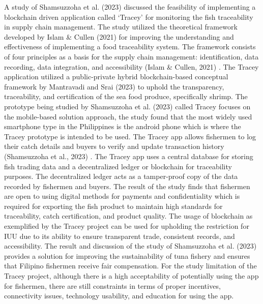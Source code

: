 A study of Shamsuzzoha et al.  (2023) \nocite{rrl-ETITSC1} discussed the feasibility of implementing a blockchain driven application called ‘Tracey’ for monitoring the fish traceability in supply chain management. The study utilized the theoretical framework developed by Islam \& Cullen (2021) \nocite{rrl-ETITSC2} for improving the understanding and effectiveness of implementing a food traceability system. The framework consists of four principles as a basis for the supply chain management: identification, data recording, data integration, and accessibility (Islam \& Cullen, 2021) \nocite{rrl-ETITSC2}. The Tracey application utilized a public-private hybrid blockchain-based conceptual framework by Mantravadi and Srai (2023) \nocite{rrl-ETITSC1} to uphold the transparency, traceability, and certification of the sea food produce, specifically shrimp. The prototype being studied by Shamsuzzoha et al. (2023) \nocite{rrl-ETITSC1} called Tracey focuses on the mobile-based solution approach, the study found that the most widely used smartphone type in the Philippines is the android phone which is where the Tracey prototype is intended to be used. The Tracey app allows fishermen to log their catch details and buyers to verify and update transaction history (Shamsuzzoha et al., 2023) \nocite{rrl-ETITSC1}. The Tracey app uses a central database for storing fish trading data and a decentralized ledger or blockchain for traceability purposes. The decentralized ledger acts as a tamper-proof copy of the data recorded by fishermen and buyers. The result of the study finds that fishermen are open to using digital methods for payments and confidentiality which is required for exporting the fish product to maintain high standards for traceability, catch certification, and product quality. The usage of blockchain as exemplified by the Tracey project can be used for upholding the restriction for IUU due to its ability to ensure transparent trade, consistent records, and accessibility. The result and discussion of the study of Shamsuzzoha et al. (2023) provides a solution for improving the sustainability of tuna fishery and ensures that Filipino fishermen receive fair compensation. For the study limitation of the Tracey project, although there is a high acceptability of potentially using the app for fishermen, there are still constraints in terms of proper incentives, connectivity issues, technology usability, and education for using the app.

